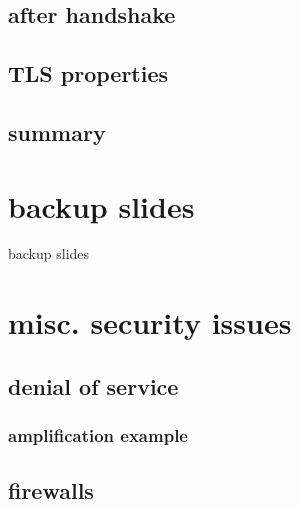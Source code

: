 \subsection{after handshake}


\subsection{TLS properties}

\subsection{summary}


\section{backup slides}
\begin{frame}{backup slides}
\end{frame}

\section{misc. security issues}

\subsection{denial of service}


\subsubsection{amplification example}

\subsection{firewalls} %





